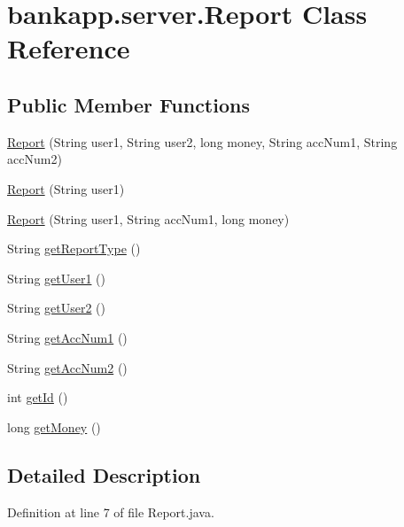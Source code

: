 \hypertarget{classbankapp_1_1server_1_1_report}{}\section{bankapp.\+server.\+Report Class Reference}
\label{classbankapp_1_1server_1_1_report}
\subsection*{Public Member Functions}
\begin{DoxyCompactItemize}
\item 
\hyperlink{classbankapp_1_1server_1_1_report_a842bc4f0ce3a205c970598a45623cdd9}{Report} (String user1, String user2, long money, String acc\+Num1, String acc\+Num2)
\item 
\hyperlink{classbankapp_1_1server_1_1_report_ad4557fd7b1937f8bb36742645d12f0e1}{Report} (String user1)
\item 
\hyperlink{classbankapp_1_1server_1_1_report_a4a9d45b7668e0733be35fa9fc1ae4479}{Report} (String user1, String acc\+Num1, long money)
\item 
String \hyperlink{classbankapp_1_1server_1_1_report_ae2789d07e7bc9bbc0c3cf4e3b8d8a19d}{get\+Report\+Type} ()
\item 
String \hyperlink{classbankapp_1_1server_1_1_report_a729278e864ae92cf24acceb146ad6e13}{get\+User1} ()
\item 
String \hyperlink{classbankapp_1_1server_1_1_report_a10fd25b1cddd994b465740e3dab0870b}{get\+User2} ()
\item 
String \hyperlink{classbankapp_1_1server_1_1_report_afe47b72f0f1624be2f77d0f573673fb3}{get\+Acc\+Num1} ()
\item 
String \hyperlink{classbankapp_1_1server_1_1_report_a4f31e0668d864a95c03b3435903ffc5d}{get\+Acc\+Num2} ()
\item 
int \hyperlink{classbankapp_1_1server_1_1_report_af5ed7bca62c8d1c92dc7b83a6d426902}{get\+Id} ()
\item 
long \hyperlink{classbankapp_1_1server_1_1_report_a83db5990ab80c28acc63e7484840c684}{get\+Money} ()
\end{DoxyCompactItemize}


\subsection{Detailed Description}


Definition at line 7 of file Report.\+java.



